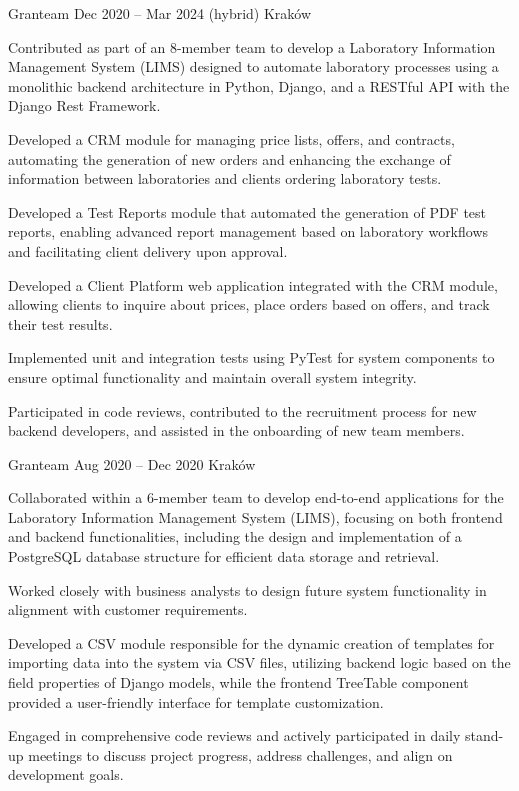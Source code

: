 \documentclass[]{awesome-cv}
\begin{document}
\begin{cventries}
    {Granteam}
    {Dec 2020 – Mar 2024}
    {(hybrid) Kraków}
    {
        \begin{cvitems}
            \item {Contributed as part of an 8-member team to develop a Laboratory Information Management System (LIMS) designed to automate laboratory processes using a monolithic backend architecture in Python, Django, and a RESTful API with the Django Rest Framework.}
            \item {Developed a CRM module for managing price lists, offers, and contracts, automating the generation of new orders and enhancing the exchange of information between laboratories and clients ordering laboratory tests.}
            \item {Developed a Test Reports module that automated the generation of PDF test reports, enabling advanced report management based on laboratory workflows and facilitating client delivery upon approval.}
            \item {Developed a Client Platform web application integrated with the CRM module, allowing clients to inquire about prices, place orders based on offers, and track their test results.}
            \item {Implemented unit and integration tests using PyTest for system components to ensure optimal functionality and maintain overall system integrity.}
            \item {Participated in code reviews, contributed to the recruitment process for new backend developers, and assisted in the onboarding of new team members.}
        \end{cvitems}
    }

    {Granteam}
    {Aug 2020 – Dec 2020}
    {Kraków}
    {
        \begin{cvitems}
            \item {Collaborated within a 6-member team to develop end-to-end applications for the Laboratory Information Management System (LIMS), focusing on both frontend and backend functionalities, including the design and implementation of a PostgreSQL database structure for efficient data storage and retrieval.}
            \item {Worked closely with business analysts to design future system functionality in alignment with customer requirements.}
            \item {Developed a CSV module responsible for the dynamic creation of templates for importing data into the system via CSV files, utilizing backend logic based on the field properties of Django models, while the frontend TreeTable component provided a user-friendly interface for template customization.}
            \item {Engaged in comprehensive code reviews and actively participated in daily stand-up meetings to discuss project progress, address challenges, and align on development goals.}
        \end{cvitems}
    }
    \vspace{1mm}

\end{cventries}
\end{document}

